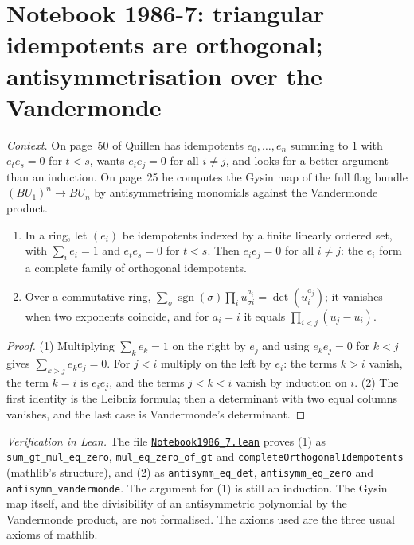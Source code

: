 \section[Notebook 1986-7: triangular idempotents; antisymmetrisation]{Notebook 1986-7: triangular idempotents are orthogonal; antisymmetrisation over the Vandermonde\protect{}}\label{sec:quillen-1986-7}

\emph{Context.} On page~50 of  Quillen has idempotents $e_0, \ldots, e_n$ summing to $1$ with $e_te_s = 0$ for $t < s$, wants $e_ie_j = 0$ for all $i \ne j$, and looks for a better argument than an induction. On page~25 he computes the Gysin map of the full flag bundle $(BU_1)^n \to BU_n$ by antisymmetrising monomials against the Vandermonde product.

\begin{encadre}
\begin{theoreme}\label{thm:quillen-1986-7}\leavevmode
\begin{enumerate}
\item In a ring, let $(e_i)$ be idempotents indexed by a finite linearly ordered set, with $\sum_i e_i = 1$ and $e_te_s = 0$ for $t < s$. Then $e_ie_j = 0$ for all $i \ne j$: the $e_i$ form a complete family of orthogonal idempotents.
\item Over a commutative ring, $\sum_\sigma \operatorname{sgn}(\sigma)\prod_i u_{\sigma i}^{a_i} = \det(u_i^{a_j})$; it vanishes when two exponents coincide, and for $a_i = i$ it equals $\prod_{i<j}(u_j - u_i)$.
\end{enumerate}
\end{theoreme}
\end{encadre}

\begin{proof}
(1) Multiplying $\sum_k e_k = 1$ on the right by $e_j$ and using $e_ke_j = 0$ for $k < j$ gives $\sum_{k > j} e_ke_j = 0$. For $j < i$ multiply on the left by $e_i$: the terms $k > i$ vanish, the term $k = i$ is $e_ie_j$, and the terms $j < k < i$ vanish by induction on $i$. (2) The first identity is the Leibniz formula; then a determinant with two equal columns vanishes, and the last case is Vandermonde's determinant.
\end{proof}

\emph{Verification in Lean.} The file \href{\leanblobmain/Notebook1986_7.lean}{\texttt{Notebook1986\_7.\allowbreak{}lean}} proves (1) as \texttt{sum\_gt\_mul\_eq\_zero}, \texttt{mul\_eq\_zero\_of\_gt} and \texttt{completeOrthogonalIdempotents} (mathlib's structure), and (2) as \texttt{antisymm\_eq\_det}, \texttt{antisymm\_eq\_zero} and \texttt{antisymm\_vandermonde}. The argument for (1) is still an induction. The Gysin map itself, and the divisibility of an antisymmetric polynomial by the Vandermonde product, are not formalised. The axioms used are the three usual axioms of mathlib.

